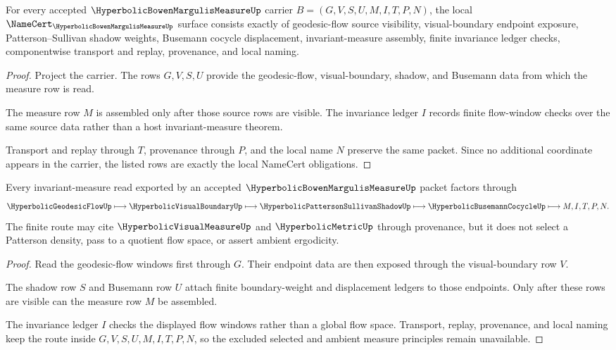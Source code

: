 \begin{theorem}
\label{thm:hyperbolic-bowen-margulis-measure-namecert-obligations}
For every accepted $\HyperbolicBowenMargulisMeasureUp$ carrier $B=(G,V,S,U,M,I,T,P,N)$, the local $\NameCert_{\HyperbolicBowenMargulisMeasureUp}$ surface consists exactly of geodesic-flow source visibility, visual-boundary endpoint exposure, Patterson--Sullivan shadow weights, Busemann cocycle displacement, invariant-measure assembly, finite invariance ledger checks, componentwise transport and replay, provenance, and local naming.
\end{theorem}
\begin{proof}
Project the carrier. The rows $G,V,S,U$ provide the geodesic-flow, visual-boundary, shadow, and Busemann data from which the measure row is read.

The measure row $M$ is assembled only after those source rows are visible. The invariance ledger $I$ records finite flow-window checks over the same source data rather than a host invariant-measure theorem.

Transport and replay through $T$, provenance through $P$, and the local name $N$ preserve the same packet. Since no additional coordinate appears in the carrier, the listed rows are exactly the local NameCert obligations.
\end{proof}

\begin{theorem}
\label{thm:hyperbolic-bowen-margulis-measure-invariant-flow-route}
Every invariant-measure read exported by an accepted $\HyperbolicBowenMargulisMeasureUp$ packet factors through
$$
\HyperbolicGeodesicFlowUp
\longmapsto
\HyperbolicVisualBoundaryUp
\longmapsto
\HyperbolicPattersonSullivanShadowUp
\longmapsto
\HyperbolicBusemannCocycleUp
\longmapsto
M,I,T,P,N .
$$
The finite route may cite $\HyperbolicVisualMeasureUp$ and $\HyperbolicMetricUp$ through provenance, but it does not select a Patterson density, pass to a quotient flow space, or assert ambient ergodicity.
\end{theorem}
\begin{proof}
Read the geodesic-flow windows first through $G$. Their endpoint data are then exposed through the visual-boundary row $V$.

The shadow row $S$ and Busemann row $U$ attach finite boundary-weight and displacement ledgers to those endpoints. Only after these rows are visible can the measure row $M$ be assembled.

The invariance ledger $I$ checks the displayed flow windows rather than a global flow space. Transport, replay, provenance, and local naming keep the route inside $G,V,S,U,M,I,T,P,N$, so the excluded selected and ambient measure principles remain unavailable.
\end{proof}

